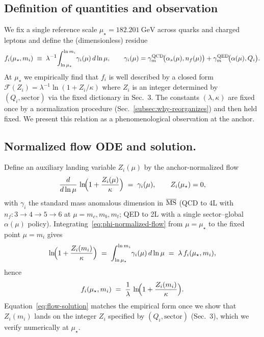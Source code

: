 \documentclass[epjc3]{svjour3}
\begin{document}
\subsection{Definition of quantities and observation}
We fix a single reference scale $\mu_\star=182.201~\mathrm{GeV}$ across quarks and charged leptons and define the (dimensionless) residue
\begin{equation}
  f_i(\mu_\star,m_i)\;\equiv\;\lambda^{-1}\!\int_{\ln\mu_\star}^{\ln m_i}\!\gamma_i(\mu)\,d\ln\mu,
  \qquad
  \gamma_i(\mu)=\gamma^{\rm QCD}_m\!\bigl(\alpha_s(\mu),n_f(\mu)\bigr)+\gamma^{\rm QED}_m\!\bigl(\alpha(\mu),Q_i\bigr).
  \label{eq:def-residue}
\end{equation}
At $\mu_\star$ we empirically find that $f_i$ is well described by a closed form $\mathcal F(Z_i)=\lambda^{-1}\ln(1+Z_i/\kappa)$ where $Z_i$ is an integer determined by $(Q_i,\text{sector})$ via the fixed dictionary in Sec.~3. The constants $(\lambda,\kappa)$ are fixed once by a normalization procedure (Sec.~\ref{subsec:why-reorganizes}) and then held fixed. We present this relation as a phenomenological observation at the anchor.

\subsection{Normalized flow ODE and solution.}
Define an auxiliary landing variable $Z_i(\mu)$ by the anchor-normalized flow
\begin{equation}
  \frac{d}{d\ln\mu}\,
  \ln\!\Bigl(1+\frac{Z_i(\mu)}{\kappa}\Bigr)
  \;=\;
  \gamma_i(\mu),
  \qquad
  Z_i(\mu_\star)=0,
  \label{eq:phi-normalized-flow}
\end{equation}
with $\gamma_i$ the standard mass anomalous dimension in $\overline{\rm MS}$ (QCD to 4L with $n_f:3\!\to\!4\!\to\!5\!\to\!6$ at $\mu=m_c,m_b,m_t$; QED to 2L with a single sector--global $\alpha(\mu)$ policy).  Integrating~\eqref{eq:phi-normalized-flow} from $\mu=\mu_\star$ to the fixed point $\mu=m_i$ gives
\begin{equation}
  \ln\!\Bigl(1+\frac{Z_i(m_i)}{\kappa}\Bigr)
  \;=\;\int_{\ln\mu_\star}^{\ln m_i}\!\gamma_i(\mu)\,d\ln\mu
  \;=\;\lambda\,f_i(\mu_\star,m_i),
\end{equation}
hence
\begin{equation}
  f_i(\mu_\star,m_i)
  \;=\;\frac{1}{\lambda}\,
  \ln\!\Bigl(1+\frac{Z_i(m_i)}{\kappa}\Bigr).
  \label{eq:flow-solution}
\end{equation}
Equation~\eqref{eq:flow-solution} matches the empirical form once we show that $Z_i(m_i)$ lands on the integer $Z_i$ specified by $(Q_i,\text{sector})$ (Sec.~3), which we verify numerically at $\mu_\star$.
\end{document}
